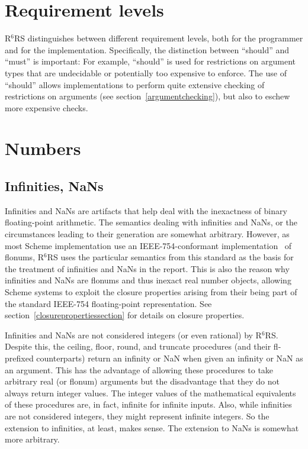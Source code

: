 \documentclass[twoside,twocolumn]{algol60}
\newcommand{\rn}[1]{R$^{#1}$RS}
\begin{document}
\chapter{Requirement levels}

\rn{6} distinguishes between different requirement levels, both for
the programmer and for the implementation.  Specifically, the
distinction between ``should'' and ``must'' is important: For example,
``should'' is used for restrictions on argument types that are
undecidable or potentially too expensive to enforce.  The use of
``should'' allows implementations to perform quite extensive checking
of restrictions on arguments (see section~\ref{argumentchecking}), but
also to eschew more expensive checks.


\chapter{Numbers}
\label{numberschapter}

\section{Infinities, NaNs}
\label{infinitiesnansection}

Infinities and NaNs are artifacts that help deal with the
inexactness of binary floating-point arithmetic.  The semantics
dealing with infinities and NaNs, or the circumstances leading to
their generation are somewhat arbitrary.  However, as most Scheme
implementation use an IEEE-754-conformant implementation~\cite{IEEE}
of flonums, \rn{6} uses the particular semantics from this standard as
the basis for the treatment of infinities and NaNs in the report.
This is also the reason why infinities and NaNs are flonums and thus
inexact real number objects, allowing Scheme systems to exploit the closure
properties arising from their being part of the standard IEEE-754
floating-point representation.  See
section~\ref{closurepropertiessection} for details on closure
properties.

Infinities and NaNs are not considered integers (or even rational) by
\rn{6}.
Despite this, the {\cf ceiling}, {\cf floor}, {\cf round}, and
{\cf truncate} procedures (and their {\cf fl}-prefixed counterparts) return an
infinity or NaN when given an infinity or NaN as an argument.
This has the advantage of allowing these procedures to take arbitrary
real (or flonum) arguments but the disadvantage that they do not always
return integer values.
The integer values of the mathematical equivalents of
these procedures are, in fact, infinite for infinite inputs.
Also, while infinities are not considered integers, they might
represent infinite integers.
So the extension to infinities, at least, makes sense.
The extension to NaNs is somewhat more arbitrary.
\end{document}

